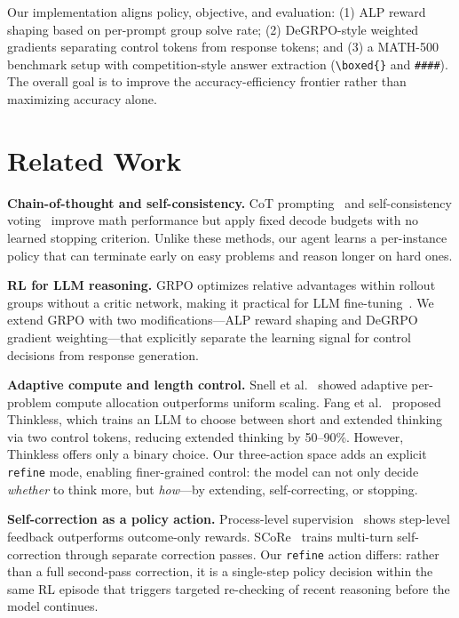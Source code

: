 \documentclass{article}
\begin{document}
Our implementation aligns policy, objective, and evaluation: (1) ALP reward shaping based on per-prompt group solve rate; (2) DeGRPO-style weighted gradients separating control tokens from response tokens; and (3) a MATH-500 benchmark setup with competition-style answer extraction (\texttt{\textbackslash boxed\{\}} and \texttt{\#\#\#\#}). The overall goal is to improve the accuracy-efficiency frontier rather than maximizing accuracy alone.

\section{Related Work}

\textbf{Chain-of-thought and self-consistency.} CoT prompting~\citep{wei2022chainofthought} and self-consistency voting~\citep{wang2023selfconsistency} improve math performance but apply fixed decode budgets with no learned stopping criterion. Unlike these methods, our agent learns a per-instance policy that can terminate early on easy problems and reason longer on hard ones.

\textbf{RL for LLM reasoning.} GRPO optimizes relative advantages within rollout groups without a critic network, making it practical for LLM fine-tuning~\citep{shao2024deepseekmath}. We extend GRPO with two modifications---ALP reward shaping and DeGRPO gradient weighting---that explicitly separate the learning signal for control decisions from response generation.

\textbf{Adaptive compute and length control.} Snell et al.~\citep{snell2024scaling} showed adaptive per-problem compute allocation outperforms uniform scaling. Fang et al.~\citep{fang2025thinkless} proposed Thinkless, which trains an LLM to choose between short and extended thinking via two control tokens, reducing extended thinking by 50--90\%. However, Thinkless offers only a binary choice. Our three-action space adds an explicit \texttt{refine} mode, enabling finer-grained control: the model can not only decide \emph{whether} to think more, but \emph{how}---by extending, self-correcting, or stopping.

\textbf{Self-correction as a policy action.} Process-level supervision~\citep{lightman2023lets,zhang2025lessons} shows step-level feedback outperforms outcome-only rewards. SCoRe~\citep{kumar2024score} trains multi-turn self-correction through separate correction passes. Our \texttt{refine} action differs: rather than a full second-pass correction, it is a single-step policy decision within the same RL episode that triggers targeted re-checking of recent reasoning before the model continues.
\end{document}
